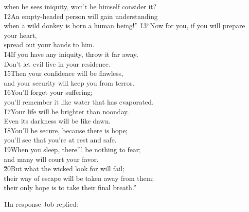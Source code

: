 \begin{poetry}
\poemll    when he sees iniquity, won't he himself consider it? \\
\poeml \v{12}An empty-headed person will gain understanding \\
\poemll    when a wild donkey is born a human being!''
\poeml \v{13}``Now for you, if you will prepare your heart, \\
\poemll    spread out your hands to him. \\
\poeml \v{14}If you have any iniquity, throw it far away. \\
\poemll    Don't let evil live in your residence. \\
\poeml \v{15}Then your confidence will be flawless, \\
\poemll    and your security will keep you from terror. \\
\poeml \v{16}You'll forget your suffering; \\
\poemll    you'll remember it like water that has evaporated. \\
\poeml \v{17}Your life will be brighter than noonday. \\
\poemll    Even its darkness will be like dawn. \\
\poeml \v{18}You'll be secure, because there is hope; \\
\poemll    you'll see that you're at rest and safe. \\
\poeml \v{19}When you sleep, there'll be nothing to fear; \\
\poemll    and many will court your favor. \\
\poeml \v{20}But what the wicked look for will fail; \\
\poemll    their way of escape will be taken away from them; \\
\poemlll       their only hope is to take their final breath.''
\end{poetry}

\v{1}In response Job replied:

